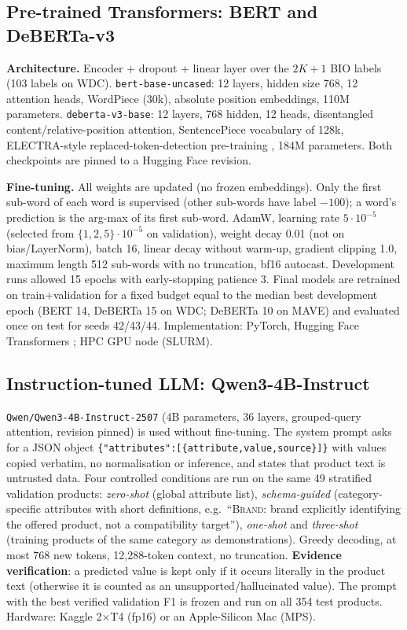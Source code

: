 \documentclass[10pt,twocolumn,a4paper]{article}
\begin{document}
\subsection{Pre-trained Transformers: BERT and DeBERTa-v3}
\textbf{Architecture.} Encoder + dropout + linear layer over the $2K{+}1$ BIO labels (103 labels on WDC). \texttt{bert-base-uncased}: 12 layers, hidden size 768, 12 attention heads, WordPiece (30k), absolute position embeddings, 110M parameters. \texttt{deberta-v3-base}: 12 layers, 768 hidden, 12 heads, disentangled content/relative-position attention, SentencePiece vocabulary of 128k, ELECTRA-style replaced-token-detection pre-training \cite{he2021deberta,he2023debertav3}, 184M parameters. Both checkpoints are pinned to a Hugging Face revision.

\textbf{Fine-tuning.} All weights are updated (no frozen embeddings). Only the first sub-word of each word is supervised (other sub-words have label $-100$); a word's prediction is the arg-max of its first sub-word. AdamW, learning rate $5\cdot10^{-5}$ (selected from $\{1,2,5\}\cdot10^{-5}$ on validation), weight decay 0.01 (not on bias/LayerNorm), batch 16, linear decay without warm-up, gradient clipping 1.0, maximum length 512 sub-words with no truncation, bf16 autocast. Development runs allowed 15 epochs with early-stopping patience 3. Final models are retrained on train+validation for a fixed budget equal to the median best development epoch (BERT 14, DeBERTa 15 on WDC; DeBERTa 10 on MAVE) and evaluated once on test for seeds 42/43/44. Implementation: PyTorch, Hugging Face Transformers \cite{wolf2020}; HPC GPU node (SLURM).

\subsection{Instruction-tuned LLM: Qwen3-4B-Instruct}
\texttt{Qwen/Qwen3-4B-Instruct-2507} \cite{qwen3} (4B parameters, 36 layers, grouped-query attention, revision pinned) is used without fine-tuning. The system prompt asks for a JSON object \verb|{"attributes":[{attribute,value,source}]}| with values copied verbatim, no normalisation or inference, and states that product text is untrusted data. Four controlled conditions are run on the same 49 stratified validation products: \emph{zero-shot} (global attribute list), \emph{schema-guided} (category-specific attributes with short definitions, e.g.\ ``\textsc{Brand}: brand explicitly identifying the offered product, not a compatibility target''), \emph{one-shot} and \emph{three-shot} (training products of the same category as demonstrations). Greedy decoding, at most 768 new tokens, 12,288-token context, no truncation. \textbf{Evidence verification}: a predicted value is kept only if it occurs literally in the product text (otherwise it is counted as an unsupported/hallucinated value). The prompt with the best verified validation F1 is frozen and run on all 354 test products. Hardware: Kaggle 2$\times$T4 (fp16) or an Apple-Silicon Mac (MPS).
\end{document}
